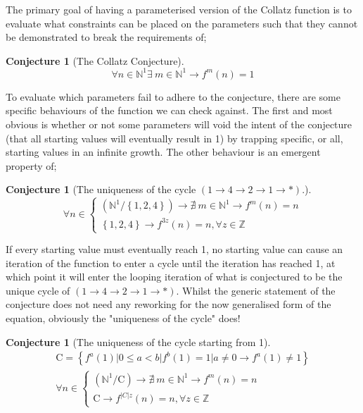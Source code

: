\documentclass[12pt,a4paper]{amsart}
\numberwithin{equation}{section}
\theoremstyle{plain}
\theoremstyle{definition}
\newtheorem{Conj}[Th]{Conjecture}
\begin{document}
The primary goal of having a parameterised version of the Collatz function is to evaluate what constraints can be placed on the parameters such that they cannot be demonstrated to break the requirements of;

\begin{Conj}[The Collatz Conjecture]
\begin{equation}
\forall n \in \mathbb{N}^{1} \exists \: m \in \mathbb{N}^{1} \rightarrow f^{m}\left ( n \right )=1
\end{equation}
\end{Conj}

To evaluate which parameters fail to adhere to the conjecture, there are some specific behaviours of the function we can check against. The first and most obvious is whether or not some parameters will void the intent of the conjecture (that all starting values will eventually result in 1) by trapping specific, or all, starting values in an infinite growth. The other behaviour is an emergent property of;

\begin{Conj}[The uniqueness of the cycle $ \left ( 1\rightarrow 4\rightarrow 2\rightarrow 1\rightarrow * \right ) $.]
\begin{equation}
\forall n \in \left\{\begin{matrix}
\left ( \mathbb{N}^{1}/\left \{ 1,2,4 \right \} \right ) \rightarrow \nexists \: m \in \mathbb{N}^{1} \rightarrow f^{m}\left ( n \right )=n \\ 
\left \{ 1,2,4 \right \} \rightarrow f^{3z}\left ( n \right )=n, \forall z \in \mathbb{Z}
\end{matrix} \right.
\end{equation}
\end{Conj}

If every starting value must eventually reach 1, no starting value can cause an iteration of the function to enter a cycle until the iteration has reached 1, at which point it will enter the looping iteration of what is conjectured to be the unique cycle of $ \left ( 1\rightarrow 4\rightarrow 2\rightarrow 1\rightarrow * \right ) $. Whilst the generic statement of the conjecture does not need any reworking for the now generalised form of the equation, obviously the "uniqueness of the cycle" does!

\begin{Conj}[The uniqueness of the cycle starting from 1]
\begin{equation}
\begin{matrix}
\mathrm{C} = \left \{ f^{a} \left ( 1 \right ) | 0 \leq a < b | f^{b} \left ( 1 \right ) = 1 | a \neq 0 \rightarrow f^{a} \left ( 1 \right ) \neq 1 \right \} \\
\forall n \in \left\{\begin{matrix}
\left ( \mathbb{N}^{1}/\mathrm{C} \right ) \rightarrow \nexists \: m \in \mathbb{N}^{1} \rightarrow f^{m}\left ( n \right )=n \\ 
\mathrm{C} \rightarrow f^{|C|z}\left ( n \right )=n, \forall z \in \mathbb{Z}
\end{matrix} \right.
\end{matrix}
\end{equation}
\end{Conj}
\end{document}
